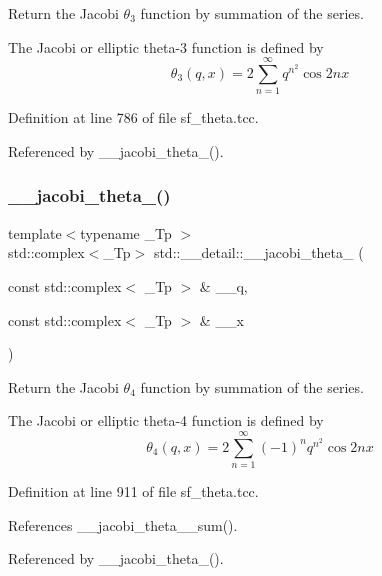 Return the Jacobi $ \theta_3 $ function by summation of the series.

The Jacobi or elliptic theta-\/3 function is defined by \[ \theta_3(q,x) = 2\sum_{n=1}^{\infty} q^{n^2}\cos{2nx} \] 

Definition at line 786 of file sf\+\_\+theta.\+tcc.



Referenced by \+\_\+\+\_\+jacobi\+\_\+theta\+\_().

\mbox{\label{namespacestd_1_1____detail_aa20f5817780f57d88bcfbd3f0179f9a2}} 
\subsubsection{\texorpdfstring{\+\_\+\+\_\+jacobi\+\_\+theta\+\_()}{\_\_jacobi\_theta\_4()}\hspace{0.1cm}{\footnotesize\ttfamily [1/2]}}
{\footnotesize\ttfamily template$<$typename \+\_\+\+Tp $>$ \\
std\+::complex$<$\+\_\+\+Tp$>$ std\+::\+\_\+\+\_\+detail\+::\+\_\+\+\_\+jacobi\+\_\+theta\+\_ (\begin{DoxyParamCaption}\item[{const std\+::complex$<$ \+\_\+\+Tp $>$ \&}]{\+\_\+\+\_\+q,  }\item[{const std\+::complex$<$ \+\_\+\+Tp $>$ \&}]{\+\_\+\+\_\+x }\end{DoxyParamCaption})}

Return the Jacobi $ \theta_4 $ function by summation of the series.

The Jacobi or elliptic theta-\/4 function is defined by \[ \theta_4(q,x) = 2\sum_{n=1}^{\infty}(-1)^n q^{n^2}\cos{2nx} \] 

Definition at line 911 of file sf\+\_\+theta.\+tcc.



References \+\_\+\+\_\+jacobi\+\_\+theta\+\_\+\_\+sum().



Referenced by \+\_\+\+\_\+jacobi\+\_\+theta\+\_().

\mbox{\label{namespacestd_1_1____detail_a0e4199a4d77f33d27b09063b25c99b7f}} 
